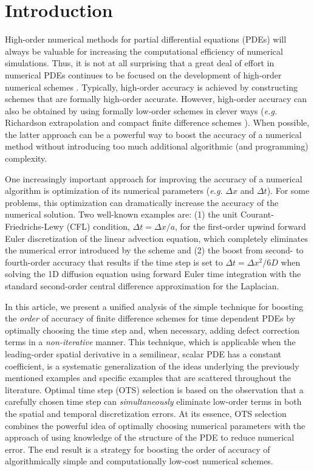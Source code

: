 \documentclass[fleqn,12pt,twoside]{article}
\def\dt{\Delta t}
\def\dx{\Delta x}
\def\eg{\emph{e.g. }}
\begin{document}
\section{Introduction}
High-order numerical methods for partial differential equations (PDEs) will 
always be valuable for increasing the computational efficiency of numerical 
simulations.  Thus, it is not at all surprising that a great deal of effort in 
numerical PDEs continues to be focused on the development of high-order 
numerical schemes
\cite{spotz_2001,bruger_2005,gibou_2005,ito_2005,shukla_2005,heidenreich_2007,shukla_2007}.  
Typically, high-order accuracy is achieved by constructing
schemes that are formally high-order accurate.  However, high-order 
accuracy can also be obtained by using formally low-order schemes in clever 
ways (\eg Richardson extrapolation and compact finite difference 
schemes \cite{spotz_2001}).  When possible, the latter approach can be a 
powerful way to boost the accuracy of a numerical method without
introducing too much additional algorithmic (and programming) complexity.

One increasingly important approach for improving the accuracy of a numerical
algorithm is optimization of its numerical parameters (\eg $\dx$ and $\dt$).
For some problems, this optimization can dramatically increase the accuracy of
the numerical solution. Two well-known examples are: (1) the unit 
Courant-Friedrichs-Lewy (CFL) condition,
$\dt = \dx/a$, for the first-order upwind forward Euler discretization of the
linear advection equation, which completely eliminates the numerical error
introduced by the scheme \cite{leveque_book_2002} and (2) the boost from
second- to fourth-order accuracy that results if the time step is set to
$\dt = \dx^2/6D$ when solving the 1D diffusion equation using forward Euler
time integration with the standard second-order central difference
approximation for the Laplacian.

In this article, we present a unified analysis of the simple technique for
boosting the \emph{order} of accuracy of finite difference schemes for time
dependent PDEs by optimally choosing the time step and, when necessary, adding
defect correction terms in a \emph{non-iterative} manner.  This technique,
which is applicable when the leading-order spatial derivative in a semilinear,
scalar PDE has a constant coefficient, is a systematic generalization of the
ideas underlying the previously mentioned examples and specific examples that
are scattered throughout the literature.
Optimal time step (OTS) selection is based on the observation that a carefully
chosen time step can \emph{simultaneously} eliminate low-order terms in both
the spatial and temporal discretization errors.  At its essence, OTS
selection combines the powerful idea of optimally choosing numerical parameters
with the approach of using knowledge of the structure of the PDE to reduce
numerical error.  The end result is a strategy for boosting the order of
accuracy of algorithmically simple and computationally low-cost numerical
schemes.
\end{document}
